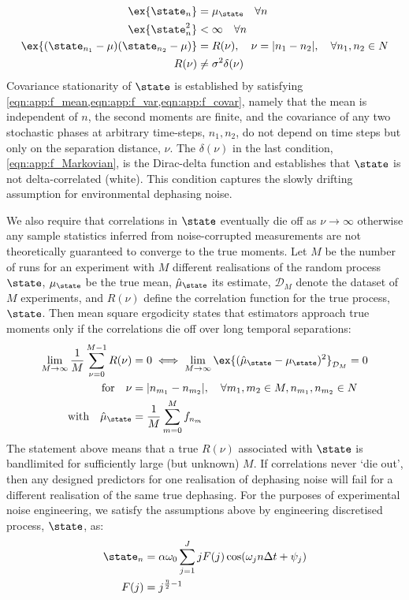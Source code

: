 \begin{align}
\ex{\state_n} &= \mu_\state \quad \forall n \label{eqn:app:f_mean} \\
\ex{\state_n^2} & < \infty \quad \forall n \label{eqn:app:f_var} \\
\ex{(\state_{n_1} - \mu)(\state_{n_2} - \mu)} &= R(\nu), \quad  \nu = |n_1-n_2|, \quad \forall n_1, n_2 \in N  \label{eqn:app:f_covar} \\
R(\nu) & \neq \sigma^2  \delta(\nu) \label{eqn:app:f_Markovian} 
\end{align}
Covariance stationarity of $\state$ is established by satisfying \cref{eqn:app:f_mean,eqn:app:f_var,eqn:app:f_covar}, namely that the mean is independent of $n$, the second moments are finite, and the covariance of any two stochastic phases at arbitrary time-steps, $n_1, n_2$, do not depend on time steps but only on the separation distance, $\nu$. The $\delta(\nu)$ in the last condition,   \cref{eqn:app:f_Markovian}, is the Dirac-delta function and establishes that $\state$ is not delta-correlated (white). This condition captures the slowly drifting assumption for environmental dephasing noise. 


We also require that correlations in $\state$ eventually die off as $\nu \to \infty$ otherwise any sample statistics inferred from noise-corrupted measurements are not theoretically guaranteed to converge to the true moments. Let $M$ be the number of runs for an experiment with $M$ different realisations of the random process $\state$, $\mu_\state$ be the true mean, $\hat{\mu}_\state$ its estimate, $\mathcal{D}_M$ denote the dataset of $M$ experiments, and $R(\nu)$ define the correlation function for the true process, $\state$. Then mean square ergodicity states that estimators approach true moments only if the correlations die off over long temporal separations:
\begin{align}
 \lim_{M \to \infty} \frac{1}{M} \sum_{\nu=0}^{M-1} R(\nu) & = 0  \iff  \lim_{M \to \infty} \ex{(\hat{\mu}_\state  - \mu_\state )^2}_{\mathcal{D}_M} = 0 \nonumber \\
\text{for} \quad \nu &= |n_{m_1} - n_{m_2}|, \quad \forall m_1, m_2 \in M, n_{m_1}, n_{m_2} \in N  \nonumber \\
\text{with} \quad \hat{\mu}_\state  &= \frac{1}{M} \sum_{m=0}^M f_{n_m} \quad   \label{eqn:app:f_msergodic}  
\end{align}
The statement above means that a true $R(\nu)$ associated with $\state$ is bandlimited for sufficiently large (but unknown) $M$. If correlations never `die out', then any designed predictors for one realisation of dephasing noise will fail for a different realisation of the same true dephasing. For the purposes of experimental noise engineering, we satisfy the assumptions above by engineering discretised process, $\state$, as:
\begin{align}
\state_n &= \alpha \omega_0 \sum_{j=1}^{J} j F(j)\cos(\omega_j n \Delta t + \psi_j) \label{eqn:app:noiseengineering} \\
F(j) & = j^{\frac{\eta}{2}-1}  
\end{align}

